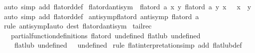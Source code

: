 \begin{isabellebody}
%
\isadelimproof
%
\endisadelimproof
%
\isatagproof
{}\isamarkupfalse%
{\isacharparenleft}{\kern0pt}auto\ simp\ add{\isacharcolon}{\kern0pt}\ flat{\isacharunderscore}{\kern0pt}ord{\isacharunderscore}{\kern0pt}def{\isacharparenright}{\kern0pt}%
\endisatagproof
{\isafoldproof}%
%
\isadelimproof
\isanewline
%
\endisadelimproof
\isanewline
{}\isamarkupfalse%
\ flat{\isacharunderscore}{\kern0pt}ord{\isacharunderscore}{\kern0pt}antisym{\isacharcolon}{\kern0pt}\ {\isachardoublequoteopen}{\isasymlbrakk}\ flat{\isacharunderscore}{\kern0pt}ord\ a\ x\ y{\isacharsemicolon}{\kern0pt}\ flat{\isacharunderscore}{\kern0pt}ord\ a\ y\ x\ {\isasymrbrakk}\ {\isasymLongrightarrow}\ x\ {\isacharequal}{\kern0pt}\ y{\isachardoublequoteclose}\isanewline
%
\isadelimproof
%
\endisadelimproof
%
\isatagproof
{}\isamarkupfalse%
{\isacharparenleft}{\kern0pt}auto\ simp\ add{\isacharcolon}{\kern0pt}\ flat{\isacharunderscore}{\kern0pt}ord{\isacharunderscore}{\kern0pt}def{\isacharparenright}{\kern0pt}%
\endisatagproof
{\isafoldproof}%
%
\isadelimproof
\isanewline
%
\endisadelimproof
\isanewline
{}\isamarkupfalse%
\ antisymp{\isacharunderscore}{\kern0pt}flat{\isacharunderscore}{\kern0pt}ord{\isacharcolon}{\kern0pt}\ {\isachardoublequoteopen}antisymp\ {\isacharparenleft}{\kern0pt}flat{\isacharunderscore}{\kern0pt}ord\ a{\isacharparenright}{\kern0pt}{\isachardoublequoteclose}\isanewline
%
\isadelimproof
%
\endisadelimproof
%
\isatagproof
{}\isamarkupfalse%
{\isacharparenleft}{\kern0pt}rule\ antisympI{\isacharparenright}{\kern0pt}{\isacharparenleft}{\kern0pt}auto\ dest{\isacharcolon}{\kern0pt}\ flat{\isacharunderscore}{\kern0pt}ord{\isacharunderscore}{\kern0pt}antisym{\isacharparenright}{\kern0pt}%
\endisatagproof
{\isafoldproof}%
%
\isadelimproof
\isanewline
%
\endisadelimproof
\isanewline
{}\isamarkupfalse%
\ tailrec{\isacharcolon}{\kern0pt}\isanewline
\ \ partial{\isacharunderscore}{\kern0pt}function{\isacharunderscore}{\kern0pt}definitions\ {\isachardoublequoteopen}flat{\isacharunderscore}{\kern0pt}ord\ undefined{\isachardoublequoteclose}\ {\isachardoublequoteopen}flat{\isacharunderscore}{\kern0pt}lub\ undefined{\isachardoublequoteclose}\isanewline
\ \ \ {\isachardoublequoteopen}flat{\isacharunderscore}{\kern0pt}lub\ undefined\ {\isacharbraceleft}{\kern0pt}{\isacharbraceright}{\kern0pt}\ {\isasymequiv}\ undefined{\isachardoublequoteclose}\isanewline
%
\isadelimproof
%
\endisadelimproof
%
\isatagproof
{}\isamarkupfalse%
\ {\isacharparenleft}{\kern0pt}rule\ flat{\isacharunderscore}{\kern0pt}interpretation{\isacharparenright}{\kern0pt}{\isacharparenleft}{\kern0pt}simp\ add{\isacharcolon}{\kern0pt}\ flat{\isacharunderscore}{\kern0pt}lub{\isacharunderscore}{\kern0pt}def{\isacharparenright}{\kern0pt}%

\end{isabellebody}
